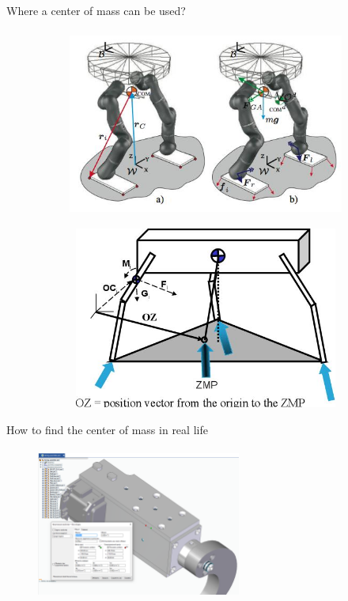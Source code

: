\documentclass[aspectratio=169]{beamer}
\begin{document}
    \begin{frame}[t]{Where a center of mass can be used?    }
    \framesubtitle{}
        \begin{figure}[H]
            \begin{subfigure}{0.39\textwidth}
                \centering\includegraphics[height=6cm,width=1\textwidth,keepaspectratio]{image7.png}
                \label{fig:image7}
            \end{subfigure}
            \begin{subfigure}{0.59\textwidth}
                \centering\includegraphics[height=6cm,width=1\textwidth,keepaspectratio]{image22.png}
                \label{fig:image22}
            \end{subfigure}
        
        \label{fig:}
        \end{figure}
    \end{frame}
    
    \begin{frame}[t]{How to find the center of mass in real life
        }
    \framesubtitle{}
        \vspace{-0.6cm}
        \begin{figure}[H]
            \centering\includegraphics[width=0.6\textwidth,keepaspectratio]{image19.png}
            \label{fig:image19}
        \end{figure}
    \end{frame}
\end{document}
